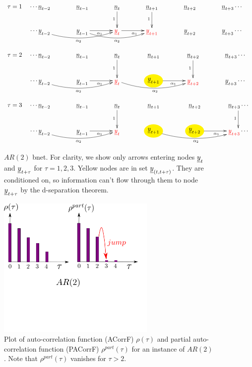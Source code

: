 \begin{figure}[h!]
$$
\begin{array}{ll}
\tau=1&
\xymatrix@C=36px{
\cdots
\rvn_{t-2}
&\rvn_{t-1}
&\rvn_t\ar[d]_1
&\rvn_{t+1}\ar[d]_1
&\rvn_{t+2}
&\rvn_{t+3}
\cdots
\\
\cdots
\rvy_{t-2}
\ar@/_1pc/[rr]_{\alp_2}
&\rvy_{t-1}
\ar@/_1pc/[rr]_{\alp_2}
\ar[r]_{\alp_1}
&{\color{red}\rvy_t}
\ar[r]_{\alp_1}
&{\color{red}\rvy_{t+1}}
&\rvy_{t+2}
&\rvy_{t+3}
\cdots
}
\\
\\
\tau=2&
\xymatrix@C=36px{
\cdots
\rvn_{t-2}
&\rvn_{t-1}
&\rvn_t\ar[d]_1
&\rvn_{t+1}
&\rvn_{t+2}\ar[d]_1
&\rvn_{t+3}
\cdots
\\
\cdots
\rvy_{t-2}
\ar@/_1pc/[rr]_{\alp_2}
&\rvy_{t-1}
\ar[r]_{\alp_1}
&{\color{red}\rvy_t}
\ar@/_1pc/[rr]_{\alp_2}
&*++[o][F*:yellow]{\rvy_{t+1}}
\ar[r]_{\alp_1}
&{\color{red}\rvy_{t+2}}
&\rvy_{t+3}
\cdots
}
\\
\\
\tau=3&
\xymatrix@C=36px{
\cdots
\rvn_{t-2}
&\rvn_{t-1}
&\rvn_t\ar[d]_1
&\rvn_{t+1}
&\rvn_{t+2}
&\rvn_{t+3}\ar[d]_1
\cdots
\\
\cdots
\rvy_{t-2}
\ar@/_1pc/[rr]_{\alp_2}
&\rvy_{t-1}
\ar[r]_{\alp_1}
&{\color{red}\rvy_t}
&*++[o][F*:yellow]{\rvy_{t+1}}
\ar@/_1pc/[rr]_{\alp_2}
&*++[o][F*:yellow]{\rvy_{t+2}}
\ar[r]_{\alp_1}
&{\color{red}\rvy_{t+3}}
\cdots
}
\end{array}
$$
\caption{$AR(2)$ bnet.
For clarity, we show only arrows
entering nodes
$\rvy_t$ and $\rvy_{t+\tau}$
for $\tau=1,2,3$.
Yellow nodes are
in set $\rvy_{(t, t+\tau)}$.
They are conditioned on, so
information can't flow through them
to node $\rvy_{t+\tau}$
by the d-separation theorem.
}
\label{fig-ar-2-tau-123}
\end{figure}

\begin{figure}[h!]
\centering
\includegraphics[width=3in]
{time-arma/ar-2-ac-pac.png}
\caption{
Plot of auto-correlation function (ACorrF)
$\rho(\tau)$
and partial auto-correlation
function (PACorrF) $\rho^{part}(\tau)$
for an instance
of $AR(2)$. Note
that $\rho^{part}(\tau)$
vanishes for $\tau>2$.
}
\label{fig-ar-2-ac-pac}
\end{figure}

